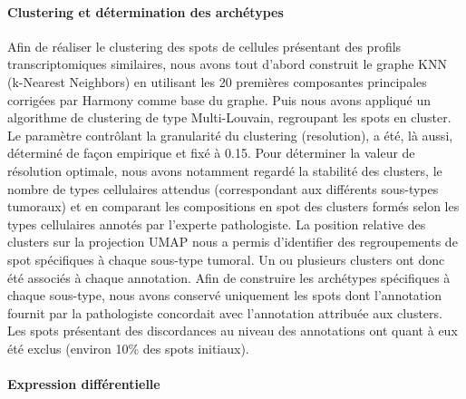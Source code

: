 \documentclass[11pt]{article}
\begin{document}
\paragraph{Clustering et détermination des archétypes}

Afin de réaliser le clustering des spots de cellules présentant des profils transcriptomiques similaires, nous avons tout d’abord construit le graphe KNN (k-Nearest Neighbors) en utilisant les 20 premières composantes principales corrigées par Harmony comme base du graphe. Puis nous avons appliqué un algorithme de clustering de type Multi-Louvain, regroupant les spots en cluster. Le paramètre contrôlant la granularité du clustering (resolution), a été, là aussi, déterminé de façon empirique et fixé à 0.15. Pour déterminer la valeur de résolution optimale, nous avons notamment regardé la stabilité des clusters, le nombre de types cellulaires attendus (correspondant aux différents sous-types tumoraux) et en comparant les compositions en spot des clusters formés selon les types cellulaires annotés par l’experte pathologiste. La position relative des clusters sur la projection UMAP nous a permis d’identifier des regroupements de spot spécifiques à chaque sous-type tumoral. Un ou plusieurs clusters ont donc été associés à chaque annotation. Afin de construire les archétypes spécifiques à chaque sous-type, nous avons conservé uniquement les spots dont l’annotation fournit par la pathologiste concordait avec l’annotation attribuée aux clusters. Les spots présentant des discordances au niveau des annotations ont quant à eux été exclus (environ 10\% des spots initiaux).

\paragraph{Expression différentielle}
\end{document}
